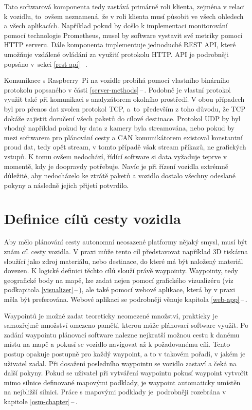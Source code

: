 \documentclass[czech, bachelor]{diploma}
\newcommand{\peteref}[1]{\ref{#1}\,--\,\nameref{#1}}
\begin{document}
Tato softwarová komponenta tedy zastává primárně roli klienta, zejména v relaci k vozidlu, to~ovšem neznamená, že v roli klienta
musí působit ve všech ohledech a všech aplikacích. Například pokud by došlo k implementaci monitorování pomocí technologie
Prometheus, musel by software vystavit své metriky pomocí HTTP serveru. Dále komponenta implementuje jednoduché REST API, které
umožňuje vzdálené ovládání za využití protokolu HTTP. API je podrobněji popsáno v~sekci \peteref{rest-api}.

Komunikace s Raspberry~Pi na vozidle probíhá pomocí vlastního binárního protokolu popsaného v části \peteref{server-methods}.
Podobně je vlastní protokol využit také při komunikaci s analyzátorem okolního prostředí. V obou případech byl pro přenos dat
zvolen protokol TCP, a~to~především z toho důvodu, že TCP dokáže zajistit doručení všech paketů do cílové destinace. Protokol UDP
by byl vhodný například pokud by data z kamery byla streamována, nebo pokud by mezi softwarem pro plánování cesty a CAN
komunikátorem existoval konstantní proud dat, tedy opět stream, v tomto případě však stream příkazů, ne grafických vstupů. K tomu
ovšem nedochází, řídící software si data vyžaduje teprve v momentě, kdy je doopravdy potřebuje. Navíc je při řízení vozidla
extrémně důležité, aby nedocházelo ke ztrátě paketů a vozidlo dostalo všechny odeslané pokyny a následně jejich přijetí potvrdilo.

\section{Definice cílů cesty vozidla} \label{target-definition}

Aby mělo plánování cesty autonomní neosazené platformy nějaký smysl, musí být znám cíl cesty vozidla. V praxi může tento cíl
představovat například 3D tiskárna sloužící jako zdroj materiálu, nebo destinace, do které má být naložený materiál dovezen.
K logické definici těchto cílů slouží právě waypointy. Waypointy, tedy geografické body na mapě, lze zadat nejen pomocí grafického
vizualizéru (viz podkapitola \peteref{visualizer}), ale také pomocí webové aplikace, která by v praxi měla být preferována.
Webové aplikaci se podrobněji věnuje kapitola \peteref{web-app}.

Waypointů je možné zadat teoreticky neomezené množství, prakticky je samozřejmě množství omezeno pamětí, kterou může plánovací
software využít. Po zadání waypointu plánovací software nalezne nejkratší možnou cestu k danému místu na mapě a pokusí se vozidlo
navigovat až k požadovanému cíli. Tento postup opakuje postupně pro každý waypoint, a to v takovém pořadí, v jakém je uživatel
zadal. Při dosažení posledního waypointu se vozidlo zastaví a čeká na další pokyny. Pokud se uživatel při vytváření waypointu
pokusí waypoint vytvořit mimo silnice definované mapovými podklady, je waypoint automaticky umístěn na nejbližší silnici.
Práce s mapovými podklady je~podrobněji rozebrána v kapitole \peteref{osm-chapter}.
\end{document}
